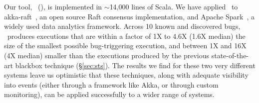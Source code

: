 
Our tool, \system~(\sys), is implemented in {\footnotesize $\sim$}14,000
lines of Scala. We have applied \sys~to akka-raft~\cite{akka-raft}, an open
source Raft consensus implementation, and Apache Spark~\cite{zaharia2012resilient}, a widely used data analytics framework.
Across 10 known and discovered bugs, \sys~produces executions that are within
a factor of 1X to 4.6X (1.6X median) the size of the smallest possible
bug-triggering execution,
and between 1X and 16X (4X median) smaller than the
executions produced by the previous state-of-the-art blackbox technique
(\S\ref{sec:sts}).
The results we find for these two very different systems leave us optimistic that these
techniques, along with adequate visibility into events (either through a
framework like Akka, or through
custom monitoring), can be applied successfully to a wider range of systems.


